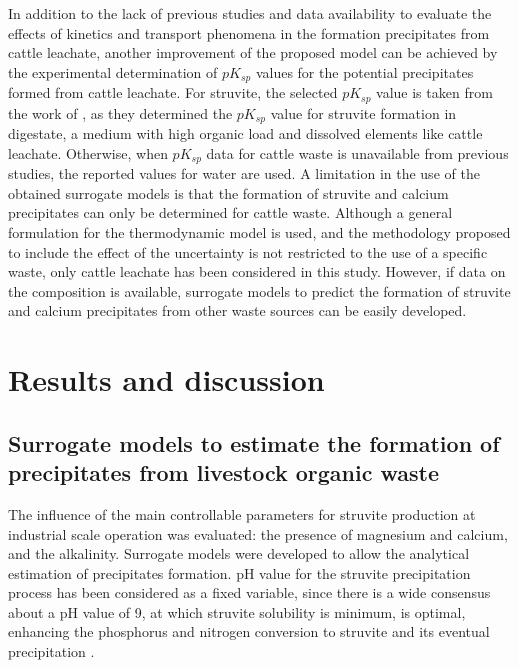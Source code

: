 \begin{refsection}[referencesCh3]
In addition to the lack of previous studies and data availability to evaluate the effects of kinetics and transport phenomena in the formation precipitates from cattle leachate, another improvement of the proposed model can be achieved by the experimental determination of $pK_{sp}$ values for the potential precipitates formed from cattle leachate. For struvite, the selected $pK_{sp}$ value is taken from the work of \citet{Ohlinger}, as they determined the $pK_{sp}$ value for struvite formation in digestate, a medium with high organic load and dissolved elements like cattle leachate. Otherwise, when $pK_{sp}$ data for cattle waste is unavailable from previous studies, the reported values for water are used. A limitation in the use of the obtained surrogate models is that the formation of struvite and calcium precipitates can only be determined for cattle waste. Although a general formulation for the thermodynamic model is used, and the methodology proposed to include the effect of the uncertainty is not restricted to the use of a specific waste, only cattle leachate has been considered in this study. However, if data on the composition is available, surrogate models to predict the formation of struvite and calcium precipitates from other waste sources can be easily developed.

\section{Results and discussion}
\subsection{Surrogate models to estimate the formation of precipitates from livestock organic waste} \label{results}
The influence of the main controllable parameters for struvite production at industrial scale operation was evaluated: the presence of magnesium and calcium, and the alkalinity. Surrogate models were developed to allow the analytical estimation of precipitates formation. pH value for the struvite precipitation process has been considered as a fixed variable, since there is a wide consensus about a pH value of 9, at which struvite solubility is minimum, is optimal, enhancing the phosphorus and nitrogen conversion to struvite and its eventual precipitation \citep{Tao, Zeng}.


\end{refsection}
